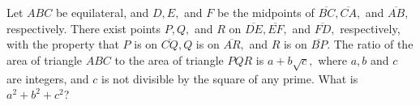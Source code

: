Let $ABC$ be equilateral, and $D, E,$ and $F$ be the midpoints of $\overline{BC}, \overline{CA},$ and $\overline{AB},$ respectively.  There exist points $P, Q,$ and $R$ on $\overline{DE}, \overline{EF},$ and $\overline{FD},$ respectively, with the property that $P$ is on $\overline{CQ}, Q$ is on $\overline{AR},$ and $R$ is on $\overline{BP}.$  The ratio of the area of triangle $ABC$ to the area of triangle $PQR$ is $a+b\sqrt{c},$ where $a, b$ and $c$ are integers, and $c$ is not divisible by the square of any prime.  What is $a^{2}+b^{2}+c^{2}$?